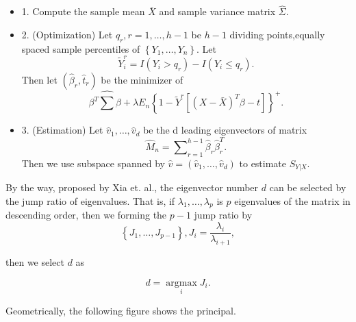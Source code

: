 \documentclass[11pt]{scrartcl} %
\begin{document}
\begin{itemize}
	\item 1. Compute the sample mean $\bar X$ and sample variance matrix $\hat \Sigma $.
	\item 2. (Optimization) Let ${q_r},r = 1, \ldots ,h - 1$ be $h-1$ dividing points,equally spaced sample percentiles of $\left\{ {{Y_1}, \ldots ,{Y_n}} \right\}$. Let
	\begin{equation*}
	\tilde Y_i^r = I\left( {{Y_i} > {q_r}} \right) - I\left( {{Y_i} \le {q_r}} \right).
	\end{equation*}
	Then let $\left( {{{\hat \beta }_r},{{\hat t}_r}} \right)$ be the minimizer of
	\begin{equation*}
	{\beta ^T}\hat \sum \beta  + \lambda {E_n}{\left\{ {1 - {{\tilde Y}^r}\left[ {{{\left( {X - \bar X} \right)}^T}\beta  - t} \right]} \right\}^ + }.
	\end{equation*}
	\item 3. (Estimation)  Let ${\hat v_1}, \ldots ,{\hat v_d}$ be the d leading eigenvectors of matrix
	\begin{equation*}
	{\hat M_n} = \sum\nolimits_{r = 1}^{h - 1} {{{\hat \beta }_r}\hat \beta _r^T}.
	\end{equation*}
	Then we use subspace spanned by $\hat v = \left( {{{\hat v}_1}, \ldots ,{{\hat v}_d}} \right)$ to estimate ${S_{Y\left| X \right.}}$.
\end{itemize}

By the way, proposed by Xia et. al.\cite{xia2015consistently}, the eigenvector number $d$ can be selected by the jump ratio of eigenvalues. That is, if ${\lambda _1}, \ldots ,{\lambda _p}$ is $p$ eigenvalues of the matrix in descending order, then we forming the $p-1$ jump ratio by
\begin{equation*}
\left\{ {{J_1}, \ldots ,{J_{p - 1}}} \right\},{J_i} = \frac{{{\lambda _i}}}{{{\lambda _{i + 1}}}},
\end{equation*}

then we select $d$ as

\begin{equation*}
d = \mathop {\arg \max }\limits_i {J_i}.
\end{equation*}



Geometrically, the following figure shows the principal.
\end{document}
